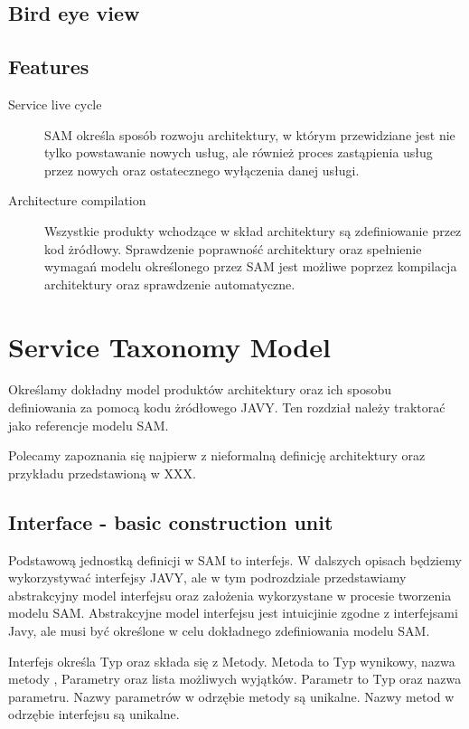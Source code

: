 \documentclass[a4paper,10pt]{article}
\begin{document}
\subsection{Bird eye view}


\subsection{Features}

\begin{description}
 \item[Service live cycle] SAM określa sposób rozwoju architektury, w którym przewidziane jest nie tylko powstawanie nowych usług, ale również proces zastąpienia usług przez nowych oraz ostatecznego wyłączenia danej usługi.
 \item[Architecture compilation] Wszystkie produkty wchodzące w skład architektury są zdefiniowanie przez kod żródłowy. Sprawdzenie poprawność architektury oraz spełnienie wymagań modelu określonego przez SAM jest możliwe poprzez kompilacja architektury oraz sprawdzenie automatyczne.
 \end{description}


\section{Service Taxonomy Model}

Określamy dokładny model produktów architektury oraz ich sposobu definiowania za pomocą kodu żródłowego JAVY. Ten rozdział należy traktorać jako referencje modelu SAM.

Polecamy zapoznania się najpierw z nieformalną definicję architektury oraz przykładu przedstawioną w XXX.


\subsection{Interface - basic construction unit}

Podstawową jednostką definicji w SAM to interfejs. W dalszych opisach będziemy wykorzystywać interfejsy JAVY, ale w tym podrozdziale przedstawiamy abstrakcyjny model interfejsu oraz założenia wykorzystane w procesie tworzenia modelu SAM. Abstrakcyjne model interfejsu jest intuicjinie zgodne z interfejsami Javy, ale musi być określone w celu dokładnego zdefiniowania modelu SAM. 


Interfejs określa Typ oraz składa się z Metody. Metoda to Typ wynikowy, nazwa metody , Parametry oraz lista możliwych wyjątków. Parametr to Typ oraz nazwa parametru. Nazwy parametrów w odrzębie metody są unikalne. Nazwy metod w odrzębie interfejsu są unikalne.
\end{document}
